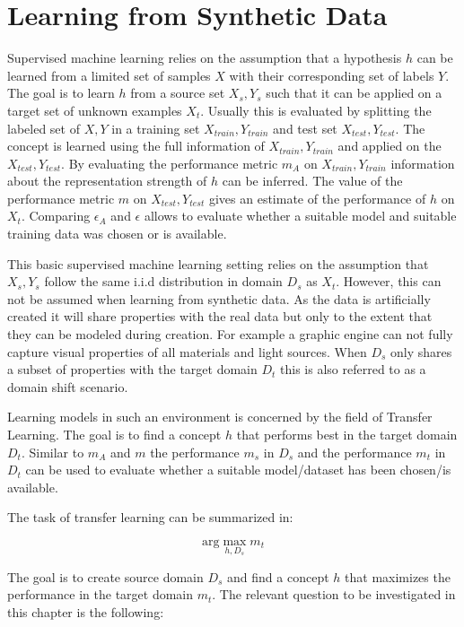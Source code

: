 \chapter{Learning from Synthetic Data}
\label{sec:training}

Supervised machine learning relies on the assumption that a hypothesis $h$ can be learned from a limited set of samples $X$ with their corresponding set of labels $Y$. The goal is to learn $h$ from a source set ${X_{s},Y_{s}}$ such that it can be applied on a target set of unknown examples $X_{t}$. Usually this is evaluated by splitting the labeled set of ${X,Y}$ in a training set ${X_{train},Y_{train}}$ and test set ${X_{test},Y_{test}}$. The concept is learned using the full information of ${X_{train},Y_{train}}$ and applied on the ${X_{test},Y_{test}}$. By evaluating the performance metric $m_A$ on ${X_{train},Y_{train}}$ information about the representation strength of $h$ can be inferred. The value of the performance metric $m$ on ${X_{test},Y_{test}}$ gives an estimate of the performance of $h$ on $X_{t}$. Comparing $\epsilon_A$ and $\epsilon$ allows to evaluate whether a suitable model and suitable training data was chosen or is available.
			
This basic supervised machine learning setting relies on the assumption that ${X_s},{Y_s}$ follow the same i.i.d distribution in domain $D_s$ as $X_t$. However, this can not be assumed when learning from synthetic data. As the data is artificially created it will share properties with the real data but only to the extent that they can be modeled during creation. For example a graphic engine can not fully capture visual properties of all materials and light sources. When $D_s$ only shares a subset of properties with the target domain $D_t$ this is also referred to as a domain shift scenario.

Learning models in such an environment is concerned by the field of Transfer Learning. The goal is to find a concept $h$ that performs best in the target domain $D_t$. Similar to $m_A$ and $m$ the performance $m_s$ in $D_s$ and the performance $m_t$ in $D_t$ can be used to evaluate whether a suitable model/dataset has been chosen/is available.

The task of transfer learning can be summarized in:

$$
\text{arg}\max\limits_{h,D_s} m_t
$$

The goal is to create source domain $D_s$ and find a concept $h$ that maximizes the performance in the target domain $m_t$. The relevant question to be investigated in this chapter is the following:

